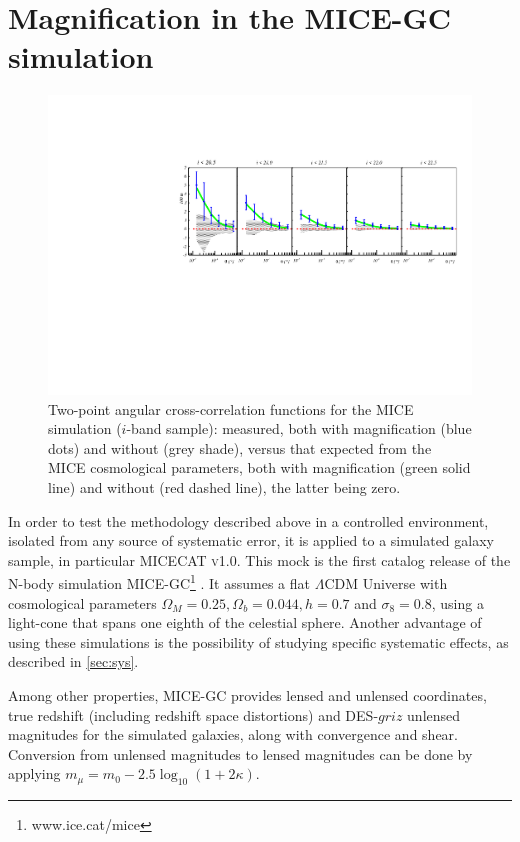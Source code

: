 \section{Magnification in the MICE-GC simulation}
\label{sec:mice}
\begin{figure}
\includegraphics[width=\textwidth,trim={0 2.3cm 0 3.5cm},clip]{./figures/mag_i_MICE.pdf}
\caption{Two-point angular cross-correlation functions for the MICE simulation ($i$-band sample): measured, both with magnification (blue dots) and without (grey shade), versus that expected from the MICE cosmological parameters, both with magnification (green solid line) and without (red dashed line), the latter being zero.}
\label{fig:MICE}
\end{figure}
In order to test the methodology described above in a controlled environment, isolated from any source of systematic error, it is applied to a simulated galaxy sample, in particular {\scshape MICECAT v1.0}.
This mock is the first catalog release of the N-body simulation MICE-GC\footnote{www.ice.cat/mice} \cite{2015MNRAS.447.1319F,2015.2987F,2015MNRAS.453.1513C}. It assumes a flat $\Lambda$CDM Universe with cosmological parameters $\Omega_M=0.25, \Omega_b=0.044, h=0.7$ and $\sigma_8 = 0.8$, using a light-cone that spans one eighth of the celestial sphere. Another advantage of using these simulations is the possibility of studying specific systematic effects, as described in \autoref{sec:sys}.

Among other properties, MICE-GC provides lensed and unlensed coordinates, true redshift (including redshift space distortions) and DES-$griz$ unlensed magnitudes for the simulated galaxies, along with convergence and shear.
Conversion from unlensed magnitudes to lensed magnitudes can be done by applying $m_\mu = m_0-2.5\log_{10}(1+2\kappa)$.

